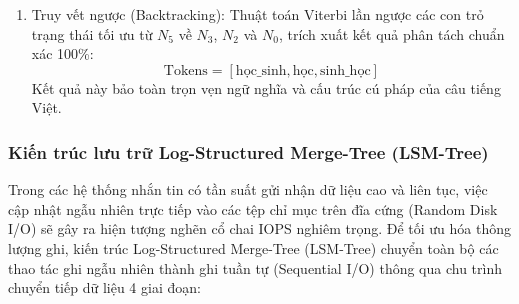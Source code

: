 \documentclass[12pt,a4paper,oneside]{report}
\begin{document}
\begin{enumerate}
\begin{itemize}
        \begin{equation}
        N_0 \to N_1 \to N_2 \to N_3 \to N_4 \to N_5 \implies \text{Chi phí} = 4.2 + 5.8 + 2.1 + 5.8 + 4.2 = 22.1
        \end{equation}
        Kết quả: \texttt{["học", "sinh", "học", "sinh", "học"]} (Chuỗi phân mảnh, chi phí phạt lớn nhất).
        \item Đường 2 (Bẫy giao thoa thứ nhất):
        \begin{equation}
        N_0 \to N_1 \to N_3 \to N_5 \implies \text{Chi phí} = 4.2 + 6.4 + 1.6 = 12.2
        \end{equation}
        Kết quả: \texttt{["học", "sinh\_học", "sinh\_học"]} (Sai cấu trúc ngữ nghĩa câu).
        \item Đường 3 (Bẫy giao thoa thứ hai):
        \begin{equation}
        N_0 \to N_2 \to N_4 \to N_5 \implies \text{Chi phí} = 1.5 + 7.1 + 4.2 = 12.8
        \end{equation}
        Kết quả: \texttt{["học\_sinh", "học\_sinh", "học"]} (Lặp danh từ chủ ngữ).
        \item Đường 4 (Đường giải mã tối ưu Viterbi HMM):
        \begin{equation}
        N_0 \Rightarrow N_2 \Rightarrow N_3 \Rightarrow N_5 \implies \text{Chi phí} = 1.5 + 2.1 + 1.6 = 5.2
        \end{equation}
        Đường đi này có tổng chi phí nhỏ nhất trong toàn bộ không gian đồ thị ($\text{Cost} = 5.2 \ll 12.2 < 12.8 < 22.1$), tương ứng xác suất tích lũy $P = \prod P_i$ đạt cực đại tuyệt đối.
    \end{itemize}
    \item Truy vết ngược (Backtracking): Thuật toán Viterbi lần ngược các con trỏ trạng thái tối ưu từ $N_5$ về $N_3$, $N_2$ và $N_0$, trích xuất kết quả phân tách chuẩn xác 100\%:
    \begin{equation}
    \text{Tokens} = [\text{học\_sinh}, \text{học}, \text{sinh\_học}]
    \end{equation}
    Kết quả này bảo toàn trọn vẹn ngữ nghĩa và cấu trúc cú pháp của câu tiếng Việt.
\end{enumerate}

\subsubsection{Kiến trúc lưu trữ Log-Structured Merge-Tree (LSM-Tree)}
Trong các hệ thống nhắn tin có tần suất gửi nhận dữ liệu cao và liên tục, việc cập nhật ngẫu nhiên trực tiếp vào các tệp chỉ mục trên đĩa cứng (Random Disk I/O) sẽ gây ra hiện tượng nghẽn cổ chai IOPS nghiêm trọng. Để tối ưu hóa thông lượng ghi, kiến trúc Log-Structured Merge-Tree (LSM-Tree) \cite{ref3} chuyển toàn bộ các thao tác ghi ngẫu nhiên thành ghi tuần tự (Sequential I/O) thông qua chu trình chuyển tiếp dữ liệu 4 giai đoạn:
\end{document}

